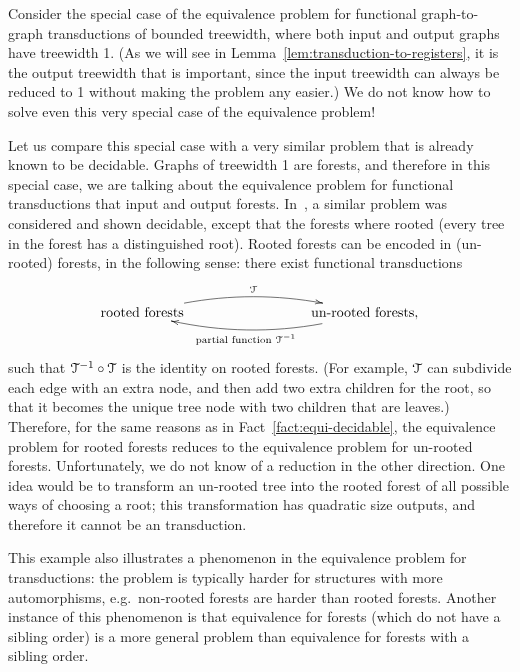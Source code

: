\begin{example}
    Consider the special case of the equivalence problem for functional graph-to-graph \mso transductions of bounded treewidth, where both input and output graphs have treewidth 1. (As we will see in Lemma~\ref{lem:transduction-to-registers}, it is the output treewidth that is important, since the input treewidth can always be reduced to 1 without making the problem any easier.)   We do not know how to solve even this very special case of the equivalence problem! 
    
    Let us compare this special case with a very similar problem that is already known to be decidable. 
    Graphs of treewidth 1 are forests, and therefore in this special case, we are talking about the equivalence problem for functional \mso transductions that input and output forests.  In~\cite[Section 3]{boiretReducingTransducerEquivalence2018}, a similar problem was considered and shown decidable,  except that the forests where rooted (every tree in the forest has a distinguished root).  Rooted forests can be encoded in (un-rooted) forests, in the following sense: there exist functional \mso transductions
    \begin{align*}
        \xymatrix@C=3cm{
            \text{rooted forests}
            \ar@/^1pc/[r]^-{\Tt} &
            \text{un-rooted forests},
            \ar@/^1pc/[l]^-{\text{partial function }\Tt^{-1}}
        }
        \end{align*}
        such that ${\mathcal T}^{-1} \circ {\mathcal T}$ is the identity on rooted forests. (For example, ${\mathcal T}$  can subdivide each edge with an extra node, and then add two extra children for the root, so that it becomes the unique tree node with two children that are leaves.) Therefore, for the same reasons as in Fact~\ref{fact:equi-decidable}, the equivalence problem for rooted forests reduces to the equivalence problem for un-rooted forests. Unfortunately, we do not know of a reduction in the other direction. One idea would be to transform an un-rooted tree into the rooted forest of all possible ways of choosing a root; this transformation has quadratic size outputs, and therefore it cannot be an \mso transduction.

        This example also illustrates a phenomenon in the equivalence problem for \mso transductions: the problem is typically harder for structures with more automorphisms, e.g.~non-rooted forests are harder than rooted forests. Another instance of this phenomenon is that equivalence for forests (which do not have a sibling order) is a more general problem than equivalence for forests with a sibling order.
    \end{example}   

